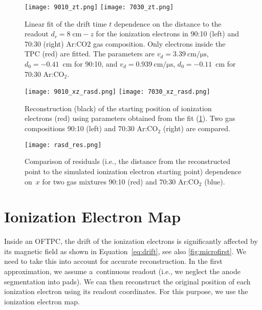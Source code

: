 		\begin{figure}
			\centering
			\texttt{[image: 9010\_zt.png]}
			\hfill
			\texttt{[image: 7030\_zt.png]}
			\caption{Linear fit of the drift time $t$ dependence on the distance to the readout $d_r = 8\;\text{cm} - z$ for the ionization electrons in 90:10 (left) and 70:30 (right) Ar:CO$2$ gas composition. Only electrons inside the \ac{TPC} (red) are fitted. The parameters are $v_d = \SI{3.39}{\centi\meter\per\micro\second}$, $d_0 = -0.41$~cm for 90:10, and $v_d = \SI{0.939}{\centi\meter\per\micro\second}$, $d_0 = -0.11$~cm for 70:30 Ar:CO$_2$.}
			\label{fig:zt}
		\end{figure}
		
		\begin{figure}
			\centering
			\texttt{[image: 9010\_xz\_rasd.png]}
			\hfill
			\texttt{[image: 7030\_xz\_rasd.png]}
			\caption{Reconstruction (black) of the starting position of ionization electrons (red) using parameters obtained from the fit (\cref{fig:zt}). Two gas compositions 90:10 (left) and 70:30 Ar:CO$_2$ (right) are compared.}
			\label{fig:rasd_xz}
		\end{figure}
		
		\begin{figure}
			\centering
			\texttt{[image: rasd\_res.png]}
			\caption{Comparison of residuals (i.e., the distance from the reconstructed point to the simulated ionization electron starting point) dependence on~$x$ for two gas mixtures 90:10 (red) and 70:30 Ar:CO$_2$ (blue).}
			\label{fig:rasd_res}
		\end{figure}
	
	\section{Ionization Electron Map}
	\label{sec:map}
		Inside an \ac{OFTPC}, the drift of the ionization electrons is significantly affected by its magnetic field as shown in Equation~\ref{eq:drift}, see also \cref{fig:microfirst}. We need to take this into account for accurate reconstruction. In the first approximation, we assume a~continuous readout (i.e., we neglect the anode segmentation into pads). We can then reconstruct the original position of each ionization electron using its readout coordinates. For this purpose, we use the ionization electron map.
		
